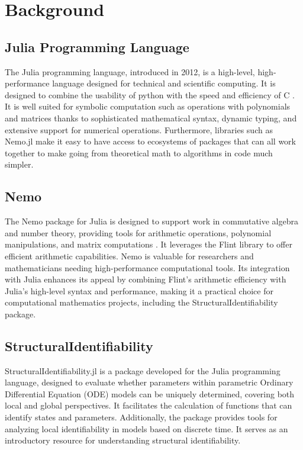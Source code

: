 \documentclass[oneside, a4paper, onecolumn, 11pt]{article}
\begin{document}
\newpage
\tableofcontents
\newpage


\section{Background}

\subsection{Julia Programming Language}

The Julia programming language, introduced in 2012, is a high-level, high-performance language designed for technical and scientific computing. It is designed to combine the usability of python with the speed and efficiency of C \cite{bezanson2017julia}. It is well suited for symbolic computation such as operations with polynomials and matrices thanks to sophisticated mathematical syntax, dynamic typing, and extensive support for numerical operations. Furthermore, libraries such as Nemo.jl make it easy to have access to ecosystems of packages that can all work together to make going from theoretical math to algorithms in code much simpler.

\subsection{Nemo}

The Nemo package for Julia is designed to support work in commutative algebra and number theory, providing tools for arithmetic operations, polynomial manipulations, and matrix computations \cite{nemo}. It leverages the Flint library to offer efficient arithmetic capabilities. Nemo is valuable for researchers and mathematicians needing high-performance computational tools. Its integration with Julia enhances its appeal by combining Flint's arithmetic efficiency with Julia's high-level syntax and performance, making it a practical choice for computational mathematics projects, including the StructuralIdentifiability package. 

\subsection{StructuralIdentifiability}

StructuralIdentifiability.jl is a package developed for the Julia programming language, designed to evaluate whether parameters within parametric Ordinary Differential Equation (ODE) models can be uniquely determined, covering both local and global perspectives. It facilitates the calculation of functions that can identify states and parameters. Additionally, the package provides tools for analyzing local identifiability in models based on discrete time. It serves as an introductory resource for understanding structural identifiability.
\end{document}
